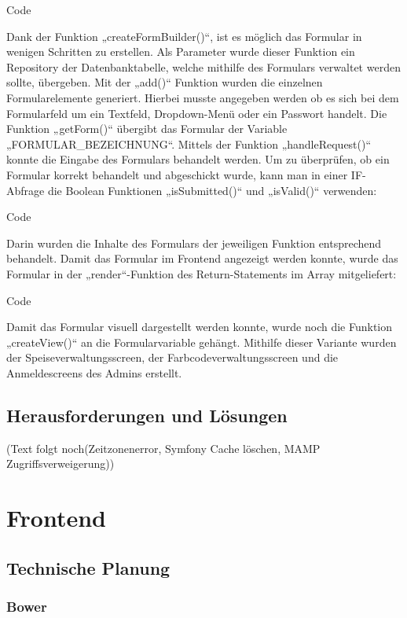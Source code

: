 	Code
	
	Dank der Funktion „createFormBuilder()“, ist es möglich das Formular in wenigen Schritten zu erstellen. Als Parameter wurde dieser Funktion ein Repository der Datenbanktabelle, welche mithilfe des Formulars verwaltet werden sollte, übergeben. Mit der „add()“ Funktion wurden die einzelnen Formularelemente generiert. Hierbei musste angegeben werden ob es sich bei dem Formularfeld um ein Textfeld, Dropdown-Menü oder ein Passwort handelt. Die Funktion „getForm()“ übergibt das Formular der Variable „FORMULAR\_BEZEICHNUNG“.
	Mittels der Funktion „handleRequest()“ konnte die Eingabe des Formulars behandelt werden. Um zu überprüfen, ob ein Formular korrekt behandelt und abgeschickt wurde, kann man in einer IF-Abfrage die Boolean Funktionen „isSubmitted()“ und „isValid()“ verwenden:
	
	Code
	
	Darin wurden die Inhalte des Formulars der jeweiligen Funktion entsprechend behandelt.
	Damit das Formular im Frontend angezeigt werden konnte, wurde das Formular in der „render“-Funktion des Return-Statements im Array mitgeliefert:
	
	Code
	
	Damit das Formular visuell dargestellt werden konnte, wurde noch die Funktion „createView()“ an die Formularvariable gehängt.
	Mithilfe dieser Variante wurden der Speiseverwaltungsscreen, der Farbcodeverwaltungsscreen und die Anmeldescreens des Admins erstellt.

  \subsection{Herausforderungen und Lösungen}

	(Text folgt noch(Zeitzonenerror, Symfony Cache löschen, MAMP Zugriffsverweigerung))

\section{Frontend}

  \subsection{Technische Planung}

    \subsubsection{Bower}

